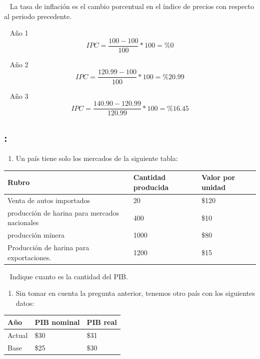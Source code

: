 \documentclass[
  letterpaper,
  DIV=11,
  numbers=noendperiod]{scrreport}
\providecommand{\tightlist}{%
  \setlength{\itemsep}{0pt}\setlength{\parskip}{0pt}}\usepackage{longtable,booktabs,array}
\begin{document}
~ La tasa de inflación es el cambio porcentual en el índice de precios
con respecto al periodo precedente.

~ Año 1 \[IPC = \frac{100-100}{100}*100= \%0\]

~ Año 2 \[IPC = \frac{120.99-100}{100}*100=\%20.99\]

~ Año 3 \[IPC = \frac{140.90-120.99}{120.99}*100=\%16.45\]

\hypertarget{section-21}{%
\subsection{:}\label{section-21}}

\begin{enumerate}
\def\labelenumi{\alph{enumi})}
\tightlist
\item
  Un país tiene solo los mercados de la siguiente tabla:
\end{enumerate}

\begin{table}[h]
    \centering
    \begin{tabular}{|p{50mm}|p{40mm}|p{40mm}|}
        \hline
        Rubro & Cantidad producida & Valor por unidad \\ \hline
        Venta de autos importados & 20 & \$120 \\ \hline
        producción de harina para mercados nacionales & 400 & \$10 \\ \hline
        producción minera & 1000 & \$80 \\ \hline
        Producción de harina para exportaciones. & 1200 & \$15 \\ \hline
        
    \end{tabular}
\end{table}

~ Indique cuanto es la cantidad del PIB.

\begin{enumerate}
\def\labelenumi{\alph{enumi})}
\setcounter{enumi}{1}
\tightlist
\item
  Sin tomar en cuenta la pregunta anterior, tenemos otro país con los
  siguientes datos:
\end{enumerate}

\begin{table}[h]
    \centering
    \begin{tabular}{|p{30mm}|p{30mm}|p{30mm}|}
        \hline
        Año & PIB nominal & PIB real \\ \hline
        Actual & \$30 & \$31 \\ \hline
        Base & \$25 & \$30 \\ \hline
    \end{tabular}
\end{table}
\end{document}

